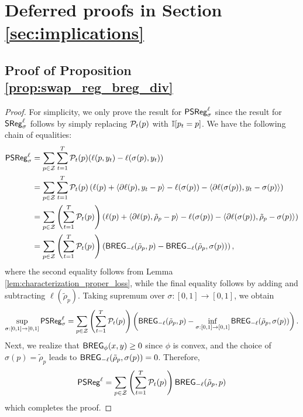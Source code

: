 \section{Deferred proofs in Section \ref{sec:implications}}\label{app:implications}
\subsection{Proof of Proposition \ref{prop:swap_reg_breg_div}}
\begin{proof}
    For simplicity, we only prove the result for $\mathsf{PSReg}_{\sigma} ^ {\ell}$ since the result for $\mathsf{SReg}_{\sigma} ^ {\ell}$ follows by simply replacing $\mathcal{P}_{t}(p)$ with $\mathbb{I}{\left[p_{t} = p\right]}$. We have the following chain of equalities: \begin{align*}
        \mathsf{PSReg}_{\sigma} ^ {\ell} &= \sum_{p \in \mathcal{Z}} \sum_{t = 1} ^ {T} \mathcal{P}_{t}(p) (\ell(p, y_{t}) - \ell(\sigma(p), y_{t})) \\
        &= \sum_{p \in \mathcal{Z}} \sum_{t = 1} ^ {T} \mathcal{P}_{t}(p) \left( \ell(p) + \left\langle \partial \ell(p), y_{t} - p \right\rangle - \ell(\sigma(p)) - \left\langle \partial \ell(\sigma(p)), y_{t} - \sigma(p) \right\rangle \right) \\
        &=  \sum_{p \in \mathcal{Z}} \left( \sum_{t = 1} ^ {T} \mathcal{P}_{t}(p) \right) \left( \ell(p) + \left\langle \partial \ell(p), \tilde{\rho}_{p} - p \right\rangle - \ell(\sigma(p)) - \left\langle \partial \ell(\sigma(p)), \tilde{\rho}_{p} - \sigma(p) \right\rangle \right) \\
        &= \sum_{p \in \mathcal{Z}} \left( \sum_{t = 1} ^ {T} \mathcal{P}_{t}(p) \right) \left( \mathsf{BREG}_{-\ell}(\tilde{\rho}_{p}, p) - \mathsf{BREG}_{-\ell}(\tilde{\rho}_{p}, \sigma(p)) \right),
    \end{align*}
where the second equality follows from Lemma \ref{lem:characterization_proper_loss}, while the final equality follows by adding and subtracting $\ell(\tilde{\rho}_{p})$. Taking supremum over $\sigma: [0, 1] \to [0, 1]$, we obtain \begin{align*}
    \sup_{\sigma: [0, 1] \to [0, 1]} \mathsf{PSReg}_{\sigma} ^ {\ell} = \sum_{p \in \mathcal{Z}} \left( \sum_{t = 1} ^ {T} \mathcal{P}_{t}(p) \right) \left( \mathsf{BREG}_{-\ell}(\tilde{\rho}_{p}, p) - \inf_{\sigma: [0, 1] \to [0, 1]} \mathsf{BREG}_{-\ell}(\tilde{\rho}_{p}, \sigma(p)) \right).
\end{align*}
Next, we realize that $\mathsf{BREG}_{\phi}(x, y) \ge 0$ since $\phi$ is convex, and the choice of $\sigma(p) = \tilde{\rho}_{p}$ leads to $\mathsf{BREG}_{-\ell}(\tilde{\rho}_{p}, \sigma(p)) = 0$. Therefore, \begin{align*}
    \mathsf{PSReg}^{\ell} = \sum_{p \in \mathcal{Z}} \left( \sum_{t = 1} ^ {T} \mathcal{P}_{t}(p) \right) \mathsf{BREG}_{-\ell}(\tilde{\rho}_{p}, p)
\end{align*}
which completes the proof.
\end{proof}


